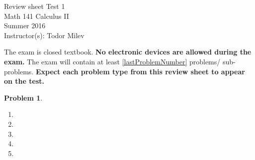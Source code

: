 \documentclass{article}
\renewcommand{\fcProblemRef}{\theproblem.\theenumi}
\newtheorem{problem}{Problem}
\begin{document}
\begin{center}
\Large
Review sheet Test 1 \\ Math 141 Calculus II \\ \normalsize Summer 2016 \\ Instructor(s): Todor Milev
\end{center}



\noindent The exam is closed textbook. \textbf{No electronic devices are allowed during the exam. } The exam will contain at least \ref{lastProblemNumber} problems/ sub-problems. \textbf{Expect each problem type from this review sheet to appear on the test.}%

\begin{problem}
\begin{multicols}{2}
\begin{enumerate}[ref={\fcProblemRef}]
\item 
\item 
\item 
\item 
\item 
\end{enumerate}
\end{multicols}
\end{problem}

\end{document}
